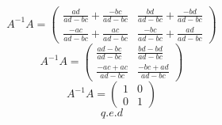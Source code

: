 \documentclass{article} %
\begin{document}
    \begin{equation}
      A^{-1}A = \begin{pmatrix} \frac{ad}{ad-bc} + \frac{-bc}{ad-bc} & \frac{bd}{ad-bc} + \frac{-bd}{ad-bc} \\ \frac{-ac}{ad-bc} + \frac{ac}{ad-bc} & \frac{-bc}{ad-bc} + \frac{ad}{ad-bc} \end{pmatrix}
    \end{equation}
    \begin{equation}
      A^{-1}A = \begin{pmatrix} \frac{ad-bc}{ad-bc} & \frac{bd-bd}{ad-bc} \\ \frac{-ac+ac}{ad-bc} & \frac{-bc+ad}{ad-bc} \end{pmatrix}
    \end{equation}
    \begin{equation}
      A^{-1}A = \begin{pmatrix} 1 & 0 \\ 0 & 1 \end{pmatrix}
    \end{equation}
    \begin{equation}
      q.e.d
    \end{equation}
\end{document}

